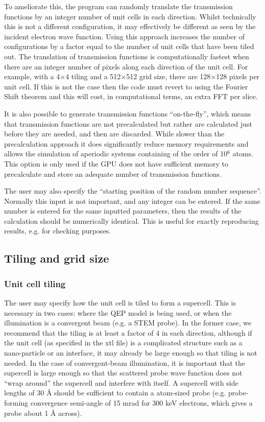 \documentclass[12pt,a4paper]{article}
\newcommand{\by}{$\times$}
\begin{document}
To ameliorate this, the program can randomly translate the transmission functions by an integer number of unit cells in each direction.
Whilst technically this is not a different configuration, it may effectively be different as seen by the incident electron wave function.
Using this approach increases the number of configurations by a factor equal to the number of unit cells that have been tiled out.
The translation of transmission functions is computationally fastest when there are an integer number of pixels along each direction of the unit cell.
For example, with a 4\by4 tiling and a 512\by512 grid size, there are 128\by128 pixels per unit cell.
If this is not the case then the code must revert to using the Fourier Shift theorem and this will cost, in computational terms, an extra FFT per slice.

It is also possible to generate transmission functions ``on-the-fly'', which means that transmission functions are not precalculated but rather are calculated just before they are needed, and then are discarded.
While slower than the precalculation approach it does significantly reduce memory requirements and allows the simulation of aperiodic systems containing of the order of 10$^{6}$ atoms.
This option is only used if the GPU does not have sufficient memory to precalculate and store an adequate number of transmission functions.

The user may also specify the ``starting position of the random number sequence''.
Normally this input is not important, and any integer can be entered.
If the same number is entered for the same inputted parameters, then the results of the calculation should be numerically identical.
This is useful for exactly reproducing results, e.g. for checking purposes.



\subsection{Tiling and grid size}

\subsubsection{Unit cell tiling}
\label{sec:tiling}

The user may specify how the unit cell is tiled to form a supercell.
This is necessary in two cases: where the QEP model is being used, or when the illumination is a convergent beam (e.g. a STEM probe).
In the former case, we recommend that the tiling is at least a factor of 4 in each direction, although if the unit cell (as specified in the xtl file) is a complicated structure such as a nano-particle or an interface, it may already be large enough so that tiling is not needed.
In the case of convergent-beam illumination, it is important that the supercell is large enough so that the scattered probe wave function does not ``wrap around'' the supercell and interfere with itself.
A supercell with side lengths of 30 \AA{} should be sufficient to contain a atom-sized probe (e.g. probe-forming convergence semi-angle of 15 mrad for 300 keV electrons, which gives a probe about 1 \AA{} across).
\end{document}

